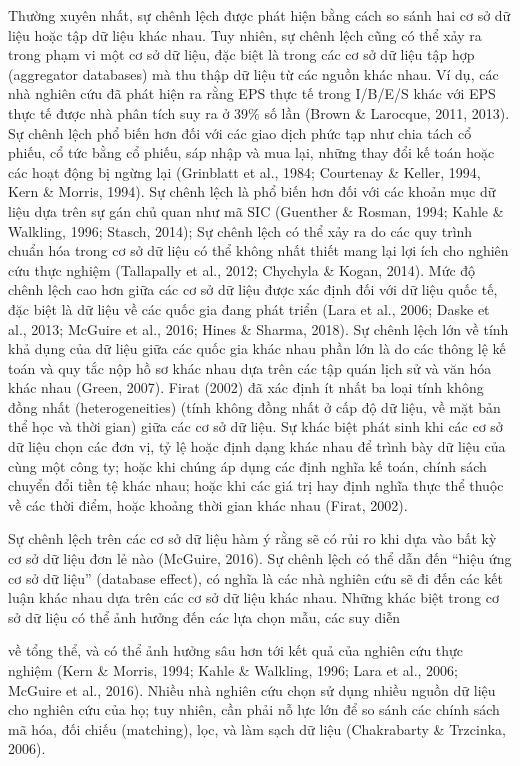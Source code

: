 Thường xuyên nhất, sự chênh lệch được phát hiện bằng cách so sánh hai cơ sở dữ liệu hoặc tập dữ liệu khác nhau. Tuy nhiên, sự chênh lệch cũng có thể xảy ra trong phạm vi một cơ sở dữ liệu, đặc biệt là trong các cơ sở dữ liệu tập hợp (aggregator databases) mà thu thập dữ liệu từ các nguồn khác nhau. Ví dụ, các nhà nghiên cứu đã phát hiện ra rằng EPS thực tế trong I/B/E/S khác với EPS thực tế được nhà phân tích suy ra ở 39\% số lần (Brown \& Larocque, 2011, 2013). Sự chênh lệch phổ biến hơn đối với các giao dịch phức tạp như chia tách cổ phiếu, cổ tức bằng cổ phiếu, sáp nhập và mua lại, những thay đổi kế toán hoặc các hoạt động bị ngừng lại (Grinblatt et al., 1984; Courtenay \& Keller, 1994, Kern \& Morris, 1994). Sự chênh lệch là phổ biến hơn đối với các khoản mục dữ liệu dựa trên sự gán chủ quan như mã SIC (Guenther \& Rosman, 1994; Kahle \& Walkling, 1996; Stasch, 2014); Sự chênh lệch có thể xảy ra do các quy trình chuẩn hóa trong cơ sở dữ liệu có thể không nhất thiết mang lại lợi ích cho nghiên cứu thực nghiệm (Tallapally et al., 2012; Chychyla \& Kogan, 2014). Mức độ chênh lệch cao hơn giữa các cơ sở dữ liệu được xác định đối với dữ liệu quốc tế, đặc biệt là dữ liệu về các quốc gia đang phát triển (Lara et al., 2006; Daske et al., 2013; McGuire et al., 2016; Hines \& Sharma, 2018). Sự chênh lệch lớn về tính khả dụng của dữ liệu giữa các quốc gia khác nhau phần lớn là do các thông lệ kế toán và quy tắc nộp hồ sơ khác nhau dựa trên các tập quán lịch sử và văn hóa khác nhau (Green, 2007). Firat (2002) đã xác định ít nhất ba loại tính không đồng nhất (heterogeneities) (tính không đồng nhất ở cấp độ dữ liệu, về mặt bản thể học và thời gian) giữa các cơ sở dữ liệu. Sự khác biệt phát sinh khi các cơ sở dữ liệu chọn các đơn vị, tỷ lệ hoặc định dạng khác nhau để trình bày dữ liệu của cùng một công ty; hoặc khi chúng áp dụng các định nghĩa kế toán, chính sách chuyển đổi tiền tệ khác nhau; hoặc khi các giá trị hay định nghĩa thực thể thuộc về các thời điểm, hoặc khoảng thời gian khác nhau (Firat, 2002).

Sự chênh lệch trên các cơ sở dữ liệu hàm ý rằng sẽ có rủi ro khi dựa vào bất kỳ cơ sở dữ liệu đơn lẻ nào (McGuire, 2016). Sự chênh lệch có thể dẫn đến ``hiệu ứng cơ sở dữ liệu'' (database effect), có nghĩa là các nhà nghiên cứu sẽ đi đến các kết luận khác nhau dựa trên các cơ sở dữ liệu khác nhau. Những khác biệt trong cơ sở dữ liệu có thể ảnh hưởng đến các lựa chọn mẫu, các suy diễn

về tổng thể, và có thể ảnh hưởng sâu hơn tới kết quả của nghiên cứu thực nghiệm (Kern \& Morris, 1994; Kahle \& Walkling, 1996; Lara et al., 2006; McGuire et al., 2016). Nhiều nhà nghiên cứu chọn sử dụng nhiều nguồn dữ liệu cho nghiên cứu của họ; tuy nhiên, cần phải nỗ lực lớn để so sánh các chính sách mã hóa, đối chiếu (matching), lọc, và làm sạch dữ liệu (Chakrabarty \& Trzcinka, 2006).

